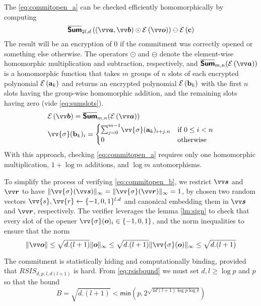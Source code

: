 The \cref{eq:commitopen_a} can be checked efficiently homomorphically by computing 
\begin{equation}\label{eq:commitverify}
\SUM_{2l,d}\left((\pv{a},\pv{b}) \odot  \enc{\pv{o}}\right) \ominus \enc{\pc} 
\end{equation}
The result will be an encryption of 0 if the commitment was correctly opened or something else otherwise.
The operators $\odot$ and $\ominus$ denote the element-wise homomorphic multiplication and subtraction, respectively, and $\SUM_{m, n}(\enc{\pv{a}})$ is a homomorphic function that takes $m$ groups of $n$ slots of each encrypted polynomial $\mathcal{E}\left({\mathbf{a}_k}\right)$ and returns an encrypted polynomial $\mathcal{E}\left({\mathbf{b}_k}\right)$ with the first $n$ slots having the group-wise homomorphic addition, and the remaining slots having zero (vide \cref{eq:sumslots}).
\begin{equation}\label{eq:sumslots}
\begin{aligned}
    &\enc{\pv{b}} = \SUM_{m, n}(\enc{\pv{a}})\\
    &\vv{\sigma}(\pb_k)_i  = 
    \begin{cases}
        \overline{\sum}_{j=0}^{m-1} \vv{\sigma}(\pa_k)_{i+j.n} & \text{if } 0\leq i < n\\
        0 & \text{otherwise}
    \end{cases}
\end{aligned}    
\end{equation}
With this approach, checking \cref{eq:commitopen_a} requires only one homomorphic multiplication, $1+\log m$ additions, and $\log m$ automorphisms.

To simplify the process of verifying \cref{eq:commitopen_b}, we restrict $\pv{s}$ and $\pv{r}$ to have $\|\vv{\sigma}(\pv{s})\|_{\infty}=\|\vv{\sigma}(\pv{r})\|_{\infty}=1$, by chosen two random vectors $\vv{s},\vv{r}\from \{-1,0,1\}^{l.d}$ and canonical embedding them in $\pv{s}$ and $\pv{r}$, respectively. The verifier leverages the lemma \ref{lm:sign} to check that every slot of the opener $\vv{\sigma}(\p{o})_i \in \{-1,0,1\}$, and
the norm inequalities\cite{damgardMultipartyComputationSomewhat2012} to ensure that the norm
\[\|\pv{o}\|\leq\sqrt{d.(l+1)}\|\p{o}\|_{\infty}\leq\sqrt{d.(l+1)}\|\vv{\sigma}(\p{o})\|_{\infty}\leq\sqrt{d.(l+1)}\]

The commitment is statistically hiding and computationally binding, provided that $RSIS_{d,p,l,d(l+1)}$ is hard. From \cref{eq:rsisbound} we must set $d,l\geq\log p$ and $p$ so that the bound 
\[B=\sqrt{d.(l+1)}<\textsf{min}(p,2^{\sqrt{4d(l+1)\log{p}\log{\delta}}})\]


